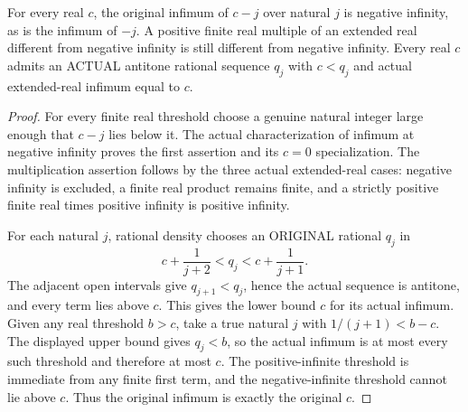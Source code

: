\begin{lemma}
\label{analysis:actual-rational-antitone-real-approximation}
\leanok
{}
For every real $c$, the original infimum of $c-j$ over natural $j$ is negative
infinity, as is the infimum of $-j$. A positive finite real multiple of an
extended real different from negative infinity is still different from
negative infinity. Every real $c$ admits an ACTUAL antitone rational sequence
$q_j$ with $c<q_j$ and actual extended-real infimum equal to $c$.
\end{lemma}
\begin{proof}
For every finite real threshold choose a genuine natural integer large enough
that $c-j$ lies below it. The actual characterization of infimum at negative
infinity proves the first assertion and its $c=0$ specialization. The
multiplication assertion follows by the three actual extended-real cases:
negative infinity is excluded, a finite real product remains finite, and a
strictly positive finite real times positive infinity is positive infinity.

For each natural $j$, rational density chooses an ORIGINAL rational $q_j$ in
\[
 c+\frac1{j+2}<q_j<c+\frac1{j+1}.
\]
The adjacent open intervals give $q_{j+1}<q_j$, hence the actual sequence is
antitone, and every term lies above $c$. This gives the lower bound $c$ for
its actual infimum. Given any real threshold $b>c$, take a true natural $j$
with $1/(j+1)<b-c$. The displayed upper bound gives $q_j<b$, so the actual
infimum is at most every such threshold and therefore at most $c$. The
positive-infinite threshold is immediate from any finite first term, and the
negative-infinite threshold cannot lie above $c$. Thus the original infimum
is exactly the original $c$.
\end{proof}
